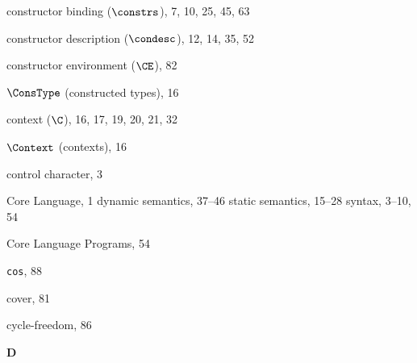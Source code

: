 \begin{theindex}
\item constructor binding ($\constrs$), 7, 10, 25, 45, 63
\item constructor description ($\condesc$), 12, 14, 35, 52
\item constructor environment ($\CE$), 82
\item $\ConsType$ (constructed types), 16
\item context ($\C$), 16, 17, 19, 20, 21, 32
\item $\Context$ (contexts), 16
\item control character, 3
\item Core Language, 1
\subitem dynamic semantics, 37--46
\subitem static semantics, 15--28
\subitem syntax, 3--10, 54
\item Core Language Programs, 54
\item {\tt cos}, 88
\item cover, 81
\item cycle-freedom, 86
\indexspace

\parbox{64mm}{\hfil{\large\bf D}\hfil}

\indexspace


\end{theindex}
